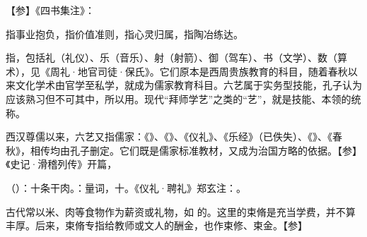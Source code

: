 {
【参】《四书集注》：
}
{} %


{
\item {}指事业抱负，指价值准则，指心灵归属，指陶冶练达。

\item {}指，包括礼（礼仪）、乐（音乐）、射（射箭）、御（驾车）、书（文学）、数（算术），见《周礼·地官司徒·保氏》。它们原本是西周贵族教育的科目，随着春秋以来文化学术由官学至私学，就成为儒家教育科目。六艺属于实务型技能，孔子认为应该熟习但不可其中，所以用。现代“拜师学艺”之类的“艺”，就是技能、本领的统称。

西汉尊儒以来，六艺又指儒家：《》、《》、《仪礼》、《乐经》（已佚失）、《》、《春秋》，相传均由孔子删定。它们既是儒家标准教材，又成为治国方略的依据。【参】《史记·滑稽列传》开篇，
}
{}


{
\item {}（）：十条干肉。：量词，十。《仪礼·聘礼》郑玄注：。

古代常以米、肉等食物作为薪资或礼物，如  的。这里的束脩是充当学费，并不算丰厚。后来，束脩专指给教师或文人的酬金，也作束修、束金。【参】 
}
{}



